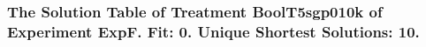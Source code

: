  \begin{frame}
 \fontsize{8pt}{9pt}\selectfont
 \frametitle{ The Solution Table of Treatment BoolT5sgp010k of Experiment ExpF. Fit: 0. Unique Shortest Solutions: 10. }

 \label{ExpFSolutionTable008.tex}  
 \end{frame}

